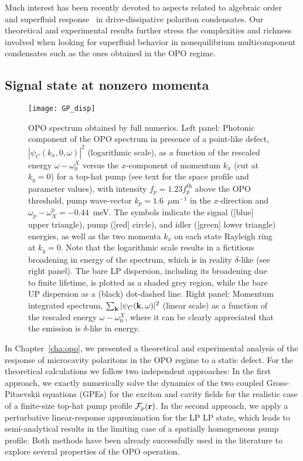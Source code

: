 Much interest has been recently devoted to aspects related to
algebraic order~\cite{Altman_2015,1412.7361v1} and superfluid
response~\cite{Keeling_2011} in drive-dissipative polariton
condensates. Our theoretical and experimental results further stress
the complexities and richness involved when looking for superfluid
behavior in nonequilibrium multicomponent condensates such as the ones
obtained in the OPO regime.


\begin{subappendices}
\section{Signal state at nonzero momenta}
\label{app:SM}
%
\begin{figure}[tb]\centering
\texttt{[image: GP\_disp]}
\caption{OPO spectrum obtained by full numerics. Left
  panel: Photonic component of the OPO spectrum in presence of a
  point-like defect, $|\psi_C(k_x,0,\omega)|^2$ (logarithmic scale),
  as a function of the rescaled energy $\omega - \omega_0^X$ versus
  the $x$-component of momentum $k_x$ (cut at $k_y=0$) for a top-hat
  pump (see text for the space profile and parameter values), with
  intensity $f_p=1.23 f_p^{\text{th}}$ above the OPO threshold, pump
  wave-vector $k_p=1.6$~$\mu$m$^{-1}$ in the $x$-direction and
  $\omega_p-\omega_X^0=-0.44$~meV. The symbols indicate the signal
  ([blue] upper triangle), pump ([red] circle), and idler ([green]
  lower triangle) energies, as well as the two momenta $k_x$ on each
  state Rayleigh ring at $k_y=0$. Note that the logarithmic scale
  results in a fictitious broadening in energy of the spectrum, which
  is in reality $\delta$-like (see right panel). The bare LP
  dispersion, including its broadening due to finite lifetime, is
  plotted as a shaded grey region, while the bare UP dispersion as a
  (black) dot-dashed line. Right panel: Momentum integrated spectrum,
  $\sum_{\mathbf{k}} |\psi_C(\mathbf{k},\omega)|^2$ (linear scale) as a
  function of the rescaled energy $\omega - \omega_0^X$, where it can
  be clearly appreciated that the emission is $\delta$-like in
  energy.}
\label{fig:spectGP}
\end{figure}
%
In Chapter~\ref{cha:opo}, we presented a theoretical and experimental
analysis of the response of microcavity polaritons in the OPO regime
to a static defect.
%
For the theoretical calculations we follow two independent approaches:
In the first approach, we exactly numerically solve the dynamics of
the two coupled Gross-Pitaevskii equations (GPEs) for the exciton and
cavity fields for the realistic case of a finite-size top-hat pump
profile $\mathcal{F}_p(\mathbf{r})$. In the second approach, we apply a
perturbative linear-response approximation for the LP
LP state, which leads to semi-analytical results in the limiting case
of a spatially homogeneous pump profile. Both methods have been
already successfully used in the literature to explore several
properties of the OPO operation.


\end{subappendices}
